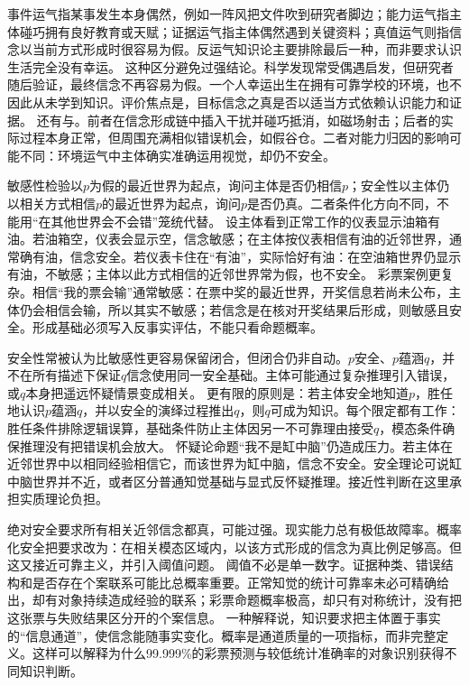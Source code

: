 事件运气指某事发生本身偶然，例如一阵风把文件吹到研究者脚边；能力运气指主体碰巧拥有良好教育或天赋；证据运气指主体偶然遇到关键资料；真值运气则指信念以当前方式形成时很容易为假。反运气知识论主要排除最后一种，而非要求认识生活完全没有幸运。 这种区分避免过强结论。科学发现常受偶遇启发，但研究者随后验证，最终信念不再容易为假。一个人幸运出生在拥有可靠学校的环境，也不因此从未学到知识。评价焦点是，目标信念之真是否以适当方式依赖认识能力和证据。 还有与。前者在信念形成链中插入干扰并碰巧抵消，如磁场射击；后者的实际过程本身正常，但周围充满相似错误机会，如假谷仓。二者对能力归因的影响可能不同：环境运气中主体确实准确运用视觉，却仍不安全。

敏感性检验以$p$为假的最近世界为起点，询问主体是否仍相信$p$；安全性以主体仍以相关方式相信$p$的最近世界为起点，询问$p$是否仍真。二者条件化方向不同，不能用“在其他世界会不会错”笼统代替。 设主体看到正常工作的仪表显示油箱有油。若油箱空，仪表会显示空，信念敏感；在主体按仪表相信有油的近邻世界，通常确有油，信念安全。若仪表卡住在“有油”，实际恰好有油：在空油箱世界仍显示有油，不敏感；主体以此方式相信的近邻世界常为假，也不安全。 彩票案例更复杂。相信“我的票会输”通常敏感：在票中奖的最近世界，开奖信息若尚未公布，主体仍会相信会输，所以其实不敏感；若信念是在核对开奖结果后形成，则敏感且安全。形成基础必须写入反事实评估，不能只看命题概率。

安全性常被认为比敏感性更容易保留闭合，但闭合仍非自动。$p$安全、$p$蕴涵$q$，并不在所有描述下保证$q$信念使用同一安全基础。主体可能通过复杂推理引入错误，或$q$本身把遥远怀疑情景变成相关。 更有限的原则是：若主体安全地知道$p$，胜任地认识$p$蕴涵$q$，并以安全的演绎过程推出$q$，则$q$可成为知识。每个限定都有工作：胜任条件排除逻辑误算，基础条件防止主体因另一不可靠理由接受$q$，模态条件确保推理没有把错误机会放大。 怀疑论命题“我不是缸中脑”仍造成压力。若主体在近邻世界中以相同经验相信它，而该世界为缸中脑，信念不安全。安全理论可说缸中脑世界并不近，或者区分普通知觉基础与显式反怀疑推理。接近性判断在这里承担实质理论负担。

绝对安全要求所有相关近邻信念都真，可能过强。现实能力总有极低故障率。概率化安全把要求改为：在相关模态区域内，以该方式形成的信念为真比例足够高。但这又接近可靠主义，并引入阈值问题。 阈值不必是单一数字。证据种类、错误结构和是否存在个案联系可能比总概率重要。正常知觉的统计可靠率未必可精确给出，却有对象持续造成经验的联系；彩票命题概率极高，却只有对称统计，没有把这张票与失败结果区分开的个案信息。 一种解释说，知识要求把主体置于事实的“信息通道”，使信念能随事实变化。概率是通道质量的一项指标，而非完整定义。这样可以解释为什么99.999\%的彩票预测与较低统计准确率的对象识别获得不同知识判断。

